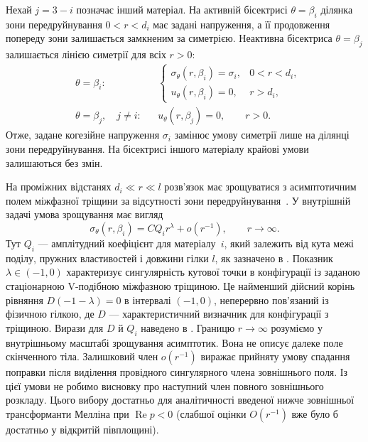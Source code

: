 Нехай $j=3-i$ позначає інший матеріал. На активній бісектрисі $\theta=\beta_i$ ділянка зони передруйнування $0<r<d_i$ має задані напруження, а її продовження попереду зони залишається замкненим за симетрією. Неактивна бісектриса $\theta=\beta_j$ залишається лінією симетрії для всіх $r>0$:
\begin{equation}
\label{eq:process-zone-boundary-conditions}
\begin{aligned}
  &\theta=\beta_i: &&
  \begin{cases}
    \sigma_\theta(r,\beta_i)=\sigma_i, & 0<r<d_i,\\
    u_\theta(r,\beta_i)=0, & r>d_i,
  \end{cases}\\[4pt]
  &\theta=\beta_j,\quad j\ne i: &&
    u_\theta(r,\beta_j)=0,\qquad r>0.
\end{aligned}
\end{equation}
Отже, задане когезійне напруження $\sigma_i$ замінює умову симетрії лише на ділянці зони передруйнування. На бісектрисі іншого матеріалу крайові умови залишаються без змін.

На проміжних відстанях $d_i\ll r\ll l$ розв’язок має зрощуватися з асимптотичним полем міжфазної тріщини за відсутності зони передруйнування~\citep{NazarenkoKipnis2022Stress}. У внутрішній задачі умова зрощування має вигляд
\begin{equation}
\label{eq:matched-far-field}
  \sigma_\theta(r,\beta_i)
    =CQ_i r^\lambda+o\!\left(r^{-1}\right),
    \qquad r\to\infty.
\end{equation}
Тут $Q_i$ — амплітудний коефіцієнт для матеріалу~$i$, який залежить від кута межі поділу, пружних властивостей і довжини гілки $l$, як зазначено в \AsymptoticsAppendix. Показник $\lambda\in(-1,0)$ характеризує сингулярність кутової точки в конфігурації із заданою стаціонарною V-подібною міжфазною тріщиною. Це найменший дійсний корінь рівняння $D(-1-\lambda)=0$ в інтервалі $(-1,0)$, неперервно пов’язаний із фізичною гілкою, де $D$ — характеристичний визначник для конфігурації з тріщиною. Вирази для $D$ й $Q_i$ наведено в \AsymptoticsAppendix. Границю $r\to\infty$ розуміємо у внутрішньому масштабі зрощування асимптотик. Вона не описує далеке поле скінченного тіла. Залишковий член $o(r^{-1})$ виражає прийняту умову спадання поправки після виділення провідного сингулярного члена зовнішнього поля. Із цієї умови не робимо висновку про наступний член повного зовнішнього розкладу. Цього вибору достатньо для аналітичності введеної нижче зовнішньої трансформанти Мелліна при $\operatorname{Re}p<0$ (слабшої оцінки $O(r^{-1})$ вже було б достатньо у відкритій півплощині).


